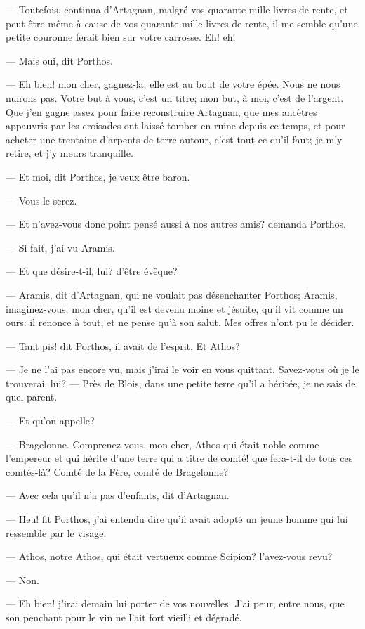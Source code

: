 — Toutefois, continua d'Artagnan, malgré vos quarante mille livres de rente, et peut-être même à cause de vos quarante mille livres de rente, il me semble qu'une petite couronne ferait bien sur votre carrosse. Eh! eh!

— Mais oui, dit Porthos.

— Eh bien! mon cher, gagnez-la; elle est au bout de votre épée. Nous ne nous nuirons pas. Votre but à vous, c'est un titre; mon but, à moi, c'est de l'argent. Que j'en gagne assez pour faire reconstruire Artagnan, que mes ancêtres appauvris par les croisades ont laissé tomber en ruine depuis ce temps, et pour acheter une trentaine d'arpents de terre autour, c'est tout ce qu'il faut; je m'y retire, et j'y meurs tranquille.

— Et moi, dit Porthos, je veux être baron.

— Vous le serez.

— Et n'avez-vous donc point pensé aussi à nos autres amis? demanda Porthos.

— Si fait, j'ai vu Aramis.

— Et que désire-t-il, lui? d'être évêque?

— Aramis, dit d'Artagnan, qui ne voulait pas désenchanter Porthos; Aramis, imaginez-vous, mon cher, qu'il est devenu moine et jésuite, qu'il vit comme un ours: il renonce à tout, et ne pense qu'à son salut. Mes offres n'ont pu le décider.

— Tant pis! dit Porthos, il avait de l'esprit. Et Athos?

— Je ne l'ai pas encore vu, mais j'irai le voir en vous quittant. Savez-vous où je le trouverai, lui?
— Près de Blois, dans une petite terre qu'il a héritée, je ne sais de quel parent.

— Et qu'on appelle?

— Bragelonne. Comprenez-vous, mon cher, Athos qui était noble comme l'empereur et qui hérite d'une terre qui a titre de comté! que fera-t-il de tous ces comtés-là? Comté de la Fère, comté de Bragelonne?

— Avec cela qu'il n'a pas d'enfants, dit d'Artagnan.

— Heu! fit Porthos, j'ai entendu dire qu'il avait adopté un jeune homme qui lui ressemble par le visage.

— Athos, notre Athos, qui était vertueux comme Scipion? l'avez-vous revu?

— Non.

— Eh bien! j'irai demain lui porter de vos nouvelles. J'ai peur, entre nous, que son penchant pour le vin ne l'ait fort vieilli et dégradé.

